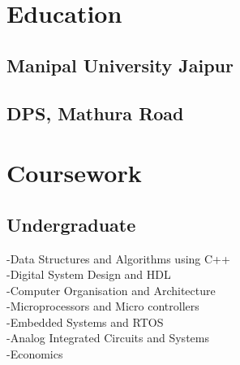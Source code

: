 \documentclass[]{deedy-resume-openfont}
\begin{document}
%
%
\lastupdated

%
%

%
%

\begin{minipage}[t]{0.38\textwidth} 


\section{Education} 

\subsection{Manipal University Jaipur}
\sectionsep

\subsection{DPS, Mathura Road}
\sectionsep



\section{Coursework}

\subsection{Undergraduate}
-Data Structures and Algorithms using C++ \\
-Digital System Design and HDL \\
-Computer Organisation and Architecture \\
-Microprocessors and Micro controllers \\
-Embedded Systems and RTOS \\
-Analog Integrated Circuits and Systems \\
-Economics \\



\end{minipage}
\end{document}
